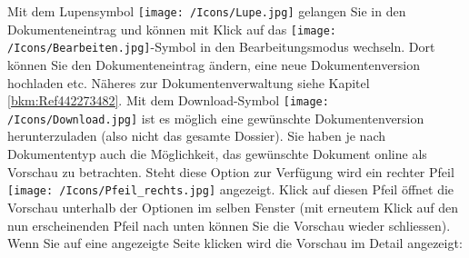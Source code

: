 Mit dem Lupensymbol \texttt{[image: /Icons/Lupe.jpg]}  gelangen Sie in den Dokumenteneintrag und können mit Klick auf das \texttt{[image: /Icons/Bearbeiten.jpg]}-Symbol in den Bearbeitungsmodus wechseln. Dort können Sie den Dokumenteneintrag ändern, eine neue Dokumentenversion hochladen etc. Näheres zur Dokumentenverwaltung siehe Kapitel \ref{bkm:Ref442273482}. Mit dem Download-Symbol \texttt{[image: /Icons/Download.jpg]}  ist es möglich eine gewünschte Dokumentenversion herunterzuladen (also nicht das gesamte Dossier). Sie haben je nach Dokumententyp auch die Möglichkeit, das gewünschte Dokument online als Vorschau zu betrachten. Steht diese Option zur Verfügung wird ein rechter Pfeil \texttt{[image: /Icons/Pfeil\_rechts.jpg]}  angezeigt. Klick auf diesen Pfeil öffnet die Vorschau unterhalb der Optionen im selben Fenster (mit erneutem Klick auf den nun erscheinenden Pfeil nach unten können Sie die Vorschau wieder schliessen).\\



Wenn Sie auf eine angezeigte Seite klicken wird die Vorschau im Detail angezeigt:

\vspace{\baselineskip}

